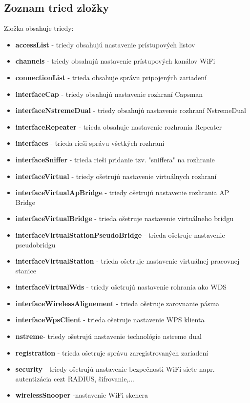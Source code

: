 \subsection{Zoznam tried zložky}
Zložka obsahuje triedy:
\begin{itemize}
\item \textbf{accessList} - triedy obsahujú nastavenie prístupových listov
\item \textbf{channels} - triedy obsahujú nastavenie prístupových kanálov WiFi
\item \textbf{connectionList} - trieda obsahuje správu pripojených zariadení
\item \textbf{interfaceCap} - triedy obsahujú nastavenie rozhraní Capsman
\item \textbf{interfaceNstremeDual} - triedy obsahujú nastavenie rozhraní NstremeDual
\item \textbf{interfaceRepeater} - trieda obsahuje nastavenie rozhrania Repeater
\item \textbf{interfaces} - trieda rieši správu všetkých rozhraní 
\item \textbf{interfaceSniffer} - trieda rieši pridanie tzv. "sniffera" na rozhranie
\item \textbf{interfaceVirtual} - triedy ošetrujú nastavenie virtuálnych rozhraní
\item \textbf{interfaceVirtualApBridge} - triedy ošetrujú nastavenie rozhrania AP Bridge
\item \textbf{interfaceVirtualBridge} - trieda ošetruje  nastavenie virtuálneho bridgu
\item \textbf{interfaceVirtualStationPseudoBridge} - trieda ošetruje nastavenie pseudobridgu
\item \textbf{interfaceVirtualStation} - trieda ošetruje nastavenie virtuálnej pracovnej stanice
\item \textbf{interfaceVirtualWds} - triedy ošetrujú nastavenie rohrania ako WDS
\item \textbf{interfaceWirelessAlignement} - trieda ošetruje zarovnanie pásma
\item \textbf{interfaceWpsClient} - trieda ošetruje nastavenie WPS klienta
\item \textbf{nstreme}- triedy ošetrujú nastavenie technológie nstreme dual
\item \textbf{registration} - trieda ošetruje správu zaregistrovaných zariadení
\item \textbf{security} - triedy ošetrujú nastavenie bezpečnosti WiFi siete napr. autentizácia cezt RADIUS, šifrovanie,...
\item \textbf{wirelessSnooper} -nastavenie WiFi skenera 
\end{itemize} 
